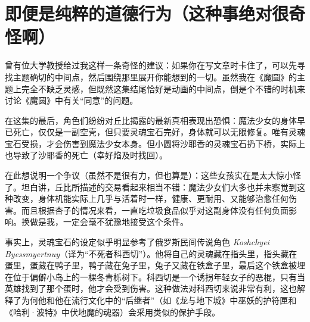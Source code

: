 \chapter[即便是纯粹的道德行为（这种事绝对很奇怪啊）]{即便是纯粹的道德行为\protect\footnotemark（这种事绝对很奇怪啊）}


曾有位大学教授给过我这样一条奇怪的建议：如果你在写文章时卡住了，可以先寻找主题确切的中间点，然后围绕那里展开你能想到的一切。虽然我在《魔圆》的主题上完全不缺乏灵感，但既然这集结尾恰好是动画的中间点，倒是个不错的时机来讨论《魔圆》中有关“同意”的问题。
  
在这集的最后，角色们纷纷对丘比揭露的最新真相表现出恐惧：魔法少女的身体早已死亡，仅仅是一副空壳，但只要灵魂宝石完好，身体就可以无限修复。唯有灵魂宝石受损，才会伤害到魔法少女本身。但小圆将沙耶香的灵魂宝石扔下桥，实际上也导致了沙耶香的死亡（幸好焰及时找回）。  

在此想说明一个争议（虽然不是很有力，但也算是）：这些女孩实在是太大惊小怪了。坦白讲，丘比所描述的交易看起来相当不错：魔法少女们大多也并未察觉到这种改变，身体机能实际上几乎与活着时一样，健康、更耐用、又能够治愈任何伤害。而且根据杏子的情况来看，一直吃垃圾食品似乎对这副身体没有任何负面影响。换做是我，一定会毫不犹豫地接受这个条件。  

事实上，灵魂宝石的设定似乎明显参考了俄罗斯民间传说角色 \emph{Koshchyei Byessmyertnuy}（译为“不死者科西切”）。他将自己的灵魂藏在指头里，指头藏在蛋里，蛋藏在鸭子里，鸭子藏在兔子里，兔子又藏在铁盒子里，最后这个铁盒被埋在位于偏僻小岛上的一棵冬青栎树下。科西切是一个诱拐年轻女子的恶棍，只有当英雄找到了那个蛋时，他才会受到伤害\cite{ref34}。这种做法对科西切来说非常有利，这也解释了为何他和他在流行文化中的“后继者”（如《龙与地下城》\cite{ref35}中巫妖的护符匣和《哈利·波特》\cite{ref36}中伏地魔的魂器）会采用类似的保护手段。  

